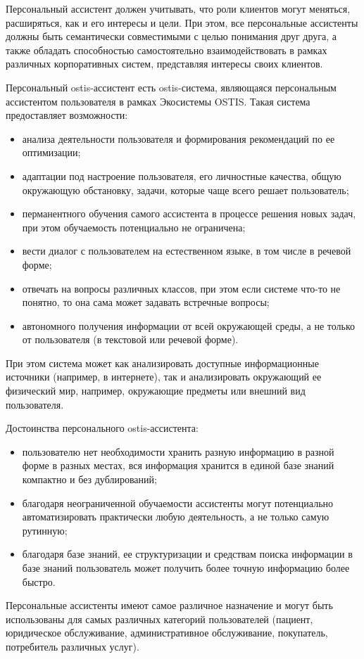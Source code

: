 Персональный ассистент должен учитывать, что роли клиентов могут меняться, расширяться, как и его интересы и цели. 
При этом, все персональные ассистенты должны быть семантически совместимыми с целью понимания друг друга, а также обладать способностью самостоятельно взаимодействовать в рамках различных корпоративных систем, представляя интересы своих клиентов.

Персональный ostis-ассистент есть ostis-система, являющаяся персональным ассистентом пользователя в рамках Экосистемы OSTIS.
Такая система предоставляет возможности:
\begin{itemize}
    \item анализа деятельности пользователя и формирования рекомендаций по ее оптимизации;
    \item адаптации под настроение пользователя, его личностные качества, общую окружающую обстановку, задачи, которые чаще всего решает пользователь;
    \item перманентного обучения самого ассистента в процессе решения новых задач, при этом обучаемость потенциально не ограничена;
    \item вести диалог с пользователем на естественном языке, в том числе в речевой форме;
    \item отвечать на вопросы различных классов, при этом если системе что-то не понятно, то она сама может задавать встречные вопросы;
    \item автономного получения информации от всей окружающей среды, а не только от пользователя (в текстовой или речевой форме).
\end{itemize}

При этом система может как анализировать доступные информационные источники (например, в интернете), так и анализировать окружающий ее физический мир, например, окружающие предметы или внешний вид пользователя.

Достоинства персонального ostis-ассистента:
\begin{itemize}
    \item пользователю нет необходимости хранить разную информацию в разной форме в разных местах, вся информация хранится в единой базе знаний компактно и без дублирований;
    \item благодаря неограниченной обучаемости ассистенты могут потенциально автоматизировать практически любую деятельность, а не только самую рутинную;
    \item благодаря базе знаний, ее структуризации и средствам поиска информации в базе знаний пользователь может получить более точную информацию более быстро.
\end{itemize}

Персональные ассистенты имеют самое различное назначение и могут быть использованы для самых различных категорий пользователей (пациент, юридическое обслуживание, административное обслуживание, покупатель, потребитель различных услуг). 
